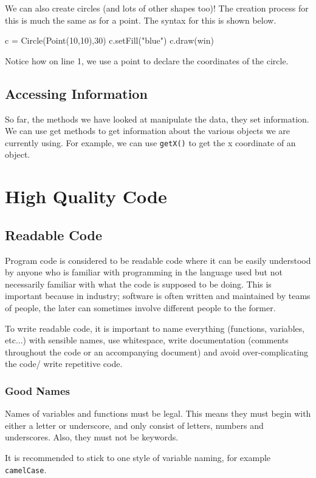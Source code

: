 We can also create circles (and lots of other shapes too)! The creation process for this is much the same as for a point. The syntax for this is shown below.
\begin{python}
c = Circle(Point(10,10),30)
c.setFill("blue")
c.draw(win)
\end{python}
Notice how on line 1, we use a point to declare the coordinates of the circle. 

\subsection*{Accessing Information}
So far, the methods we have looked at manipulate the data, they set information. We can use get methods to get information about the various objects we are currently using. For example, we can use \verb|getX()| to get the x coordinate of an object.

\section*{High Quality Code}

\subsection*{Readable Code}
Program code is considered to be readable code where it can be easily understood by anyone who is familiar with programming in the language used but not necessarily familiar with what the code is supposed to be doing. This is important because in industry; software is often written and maintained by teams of people, the later can sometimes involve different people to the former.

To write readable code, it is important to name everything (functions, variables, etc...) with sensible names, use whitespace, write documentation (comments throughout the code or an accompanying document) and avoid over-complicating the code/ write repetitive code.

\subsubsection*{Good Names}
Names of variables and functions must be legal. This means they must begin with either a letter or underscore, and only consist of letters, numbers and underscores. Also, they must not be keywords.

It is recommended to stick to one style of variable naming, for example \verb|camelCase|. 

